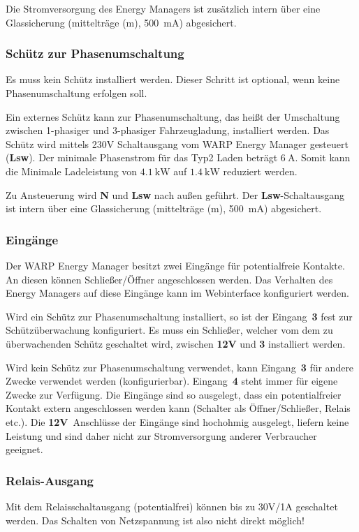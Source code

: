 \documentclass[a4paper,10pt]{article}
\newcommand{\hint}[1]{\begin{tcolorbox}[colback=boxgray,colframe=black,coltext=
white,title=Hinweis,left*=2mm,right*=2mm,boxsep=1mm,bottom=1mm,top=1mm]#1\end{tcolorbox}}
\begin{document}
\begin{multicols*}{2}
	Die Stromversorgung des Energy Managers ist zusätzlich intern über eine Glassicherung 
	(mittelträge (m), \SI{500}{\milli\ampere}) abgesichert.

	\subsubsection{Schütz zur Phasenumschaltung}
	\hint{Es muss kein Schütz installiert werden. Dieser Schritt ist optional,
	wenn keine Phasenumschaltung erfolgen soll.}

	Ein externes Schütz kann zur Phasenumschaltung, das heißt der Umschaltung
	zwischen 1-phasiger und 3-phasiger Fahrzeugladung, installiert werden. Das
	Schütz wird mittels 230V Schaltausgang vom WARP Energy Manager gesteuert
	(\textbf{Lsw}).
	Der minimale Phasenstrom für das Typ2 Laden beträgt $\SI{6}{\ampere}$. Somit
	kann die Minimale Ladeleistung von $\SI{4.1}{\kilo\watt}$ auf
	$\SI{1.4}{\kilo\watt}$ reduziert werden.

	Zu Ansteuerung wird \textbf{N} und \textbf{Lsw} nach außen geführt. Der
	\textbf{Lsw}-Schaltausgang ist intern über eine Glassicherung 
	(mittelträge (m), \SI{500}{\milli\ampere}) abgesichert.


	\subsubsection{Eingänge}
	Der WARP Energy Manager besitzt zwei Eingänge für potentialfreie Kontakte.
	An diesen können Schließer/Öffner angeschlossen werden. Das Verhalten des
	Energy Managers auf diese Eingänge kann im Webinterface konfiguriert werden.
	
	Wird ein Schütz zur Phasenumschaltung installiert, so ist der Eingang~\textbf{3} 
	fest zur Schützüberwachung konfiguriert. Es muss ein Schließer, welcher vom
	dem zu überwachenden Schütz geschaltet wird, zwischen \textbf{12V} und
	\textbf{3} installiert werden.

	Wird kein Schütz zur Phasenumschaltung verwendet, kann Eingang~\textbf{3} für
	andere Zwecke verwendet werden (konfigurierbar). Eingang~\textbf{4} steht immer
	für eigene Zwecke zur Verfügung. Die Eingänge sind so ausgelegt, dass ein potentialfreier
	Kontakt extern angeschlossen werden kann (Schalter als Öffner/Schließer, Relais etc.).
	Die \textbf{12V}~Anschlüsse der Eingänge sind hochohmig ausgelegt, liefern
	keine Leistung und sind daher nicht zur Stromversorgung anderer Verbraucher
	geeignet.

	\subsubsection{Relais-Ausgang}
	Mit dem Relaisschaltausgang (potentialfrei) können bis zu 30V/1A geschaltet
	werden. Das Schalten von Netzspannung ist also nicht direkt möglich!


\end{multicols*}
\end{document}
